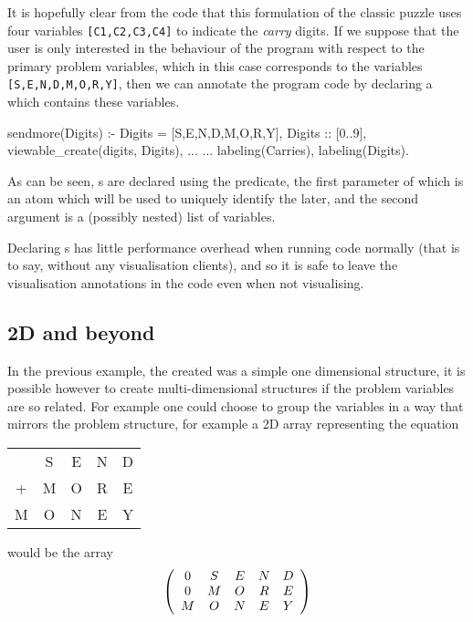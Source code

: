 It is hopefully clear from the code that this formulation of the
classic puzzle uses four variables \texttt{[C1,C2,C3,C4]} to indicate
the \emph{carry} digits.  If we suppose that the user is only
interested in the behaviour of the program with respect to the primary
problem variables, which in this case corresponds to the variables
\texttt{[S,E,N,D,M,O,R,Y]}, then we can annotate the program code by
declaring a \viewable{} which contains these variables.

\begin{code}
sendmore(Digits) :-
    Digits = [S,E,N,D,M,O,R,Y],
    Digits :: [0..9],
    viewable_create(digits, Digits),
    ...
    ...
    labeling(Carries),
    labeling(Digits).
\end{code}

As can be seen, \viewable{}s are declared using the
\viewablecreatetwo{} predicate, the first parameter of which is an
atom which will be used to uniquely identify the \viewable{} later,
and the second argument is a (possibly nested) list of variables.

Declaring \viewable{}s has little performance overhead when running
code normally (that is to say, without any visualisation clients), and
so it is safe to leave the visualisation annotations in the code even
when not visualising.

\subsection{2D and beyond}
In the previous example, the created \viewable{} was a simple one
dimensional structure, it is possible however to create
multi-dimensional structures if the problem variables are so related.
For example one could choose to group the variables in a way that
mirrors the problem structure, for example a 2D array representing the
equation

\begin{center}
\begin{tabular}{c c c c c}
  & S & E & N & D \\
+ & M & O & R & E \\
\hline
M & O & N & E & Y
\end{tabular}
\end{center}

would be the array
\begin{displaymath}
\left(\begin{array}{c c c c c}
0 & S & E & N & D \\
0 & M & O & R & E \\
M & O & N & E & Y
\end{array}\right)
\end{displaymath}

